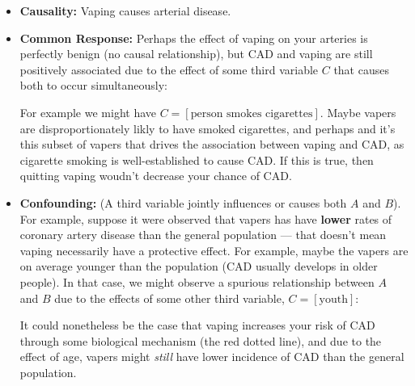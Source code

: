 \documentclass[10pt]{article}
\theoremstyle{definition}
\newcommand{\1}[1]{\textbf{1}_{\left[#1\right]}} %
\begin{document}
\begin{itemize}
  \item \textbf{Causality:} Vaping causes arterial disease.
  \begin{center}
  \end{center}
  \item \textbf{Common Response:} Perhaps the effect of vaping on your
  arteries is perfectly benign (no causal relationship), but CAD and vaping
  are still positively associated due to the effect of some third variable $C$
  that causes both to occur simultaneously:
  \begin{center}
  \end{center}
  For example we might have
  $C=\left[ \text{person smokes cigarettes} \right]$. Maybe vapers are
  disproportionately likly to have smoked cigarettes, and perhaps and it's
  this subset of vapers that drives the association between vaping and CAD, as
  cigarette smoking is well-established to cause CAD. If this is true, then
  quitting vaping woudn't decrease your chance of CAD.

  \item \textbf{Confounding:} (A third variable jointly influences or causes
  both $A$ and $B$). For example, suppose it were observed that vapers has
  have \textbf{lower} rates of coronary artery disease than the general
  population --- that doesn't mean vaping necessarily have a protective
  effect. For example, maybe the vapers are on average younger than the
  population (CAD usually develops in older people). In that case, we might
  observe a spurious relationship between $A$ and $B$ due to the effects of
  some other third variable, $C= \left[ \text{youth} \right]$:
  \begin{center}
  \end{center}
  It could nonetheless be the case that vaping increases your risk of CAD
  through some biological mechanism (the red dotted line), and due to the
  effect of age, vapers might \textit{still} have lower incidence of CAD than
  the general population.


\end{itemize}
\end{document}
